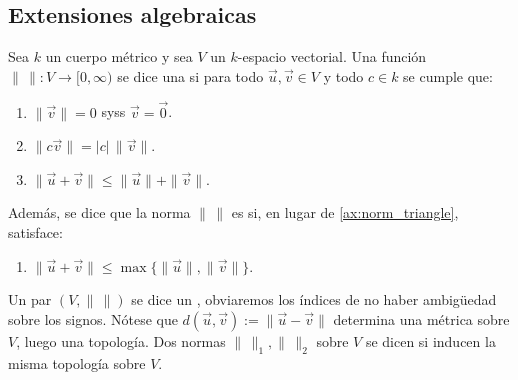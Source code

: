 \documentclass[teoria-numeros.tex]{subfiles}
\begin{document}
\subsection{Extensiones algebraicas}
\begin{mydef}
	Sea $k$ un cuerpo métrico y sea $V$ un $k$-espacio vectorial.
	Una función $\|\,\|\colon V \to [0, \infty)$ se dice una  si para todo $\vec u, \vec v\in V$ y todo $c \in k$ se cumple que:
	\begin{enumerate}[{EN}1., ref=EN\arabic*, leftmargin=*]
		\item $\|\vec v\| = 0$ syss $\vec v = \Vec 0$.
		\item $\|c \vec v\| = |c| \, \|\vec v\|$.
		\item\label{ax:norm_triangle} $\|\vec u + \vec v\| \le \|\vec u\| + \|\vec v\|$.
	\end{enumerate}
	Además, se dice que la norma $\|\,\|$ es  si, en lugar de \ref{ax:norm_triangle}, satisface:
	\begin{enumerate}[resume*]
		\item $\|\vec u + \vec v\| \le \max\{ \|\vec u\|, \|\vec v\| \}$.
	\end{enumerate}
	Un par $(V, \|\,\|)$ se dice un , obviaremos los índices de no haber ambigüedad sobre los signos.
	Nótese que $d(\vec u, \vec v) := \|\vec u - \vec v\|$ determina una métrica sobre $V$, luego una topología.
	Dos normas $\|\,\|_1, \|\,\|_2$ sobre $V$ se dicen  si inducen la misma topología sobre $V$.
\end{mydef}
\end{document}
